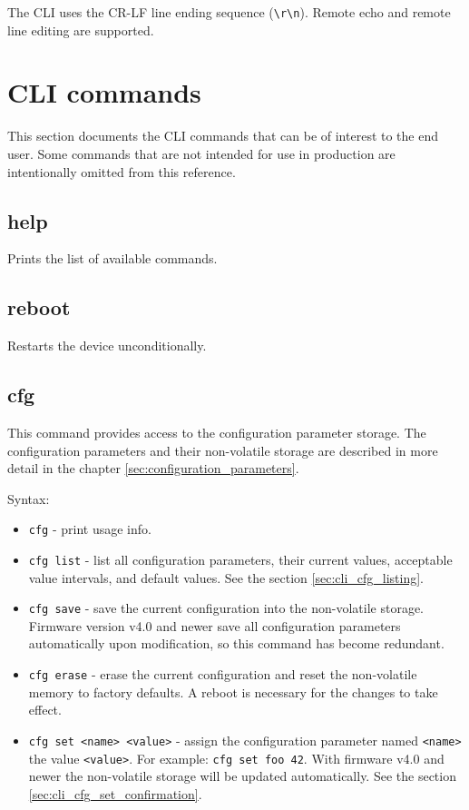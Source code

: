 \documentclass{zubaxdoc}
\begin{document}
The CLI uses the CR-LF line ending sequence (\verb|\r\n|).
Remote echo and remote line editing are supported.

\section{CLI commands}

This section documents the CLI commands that can be of interest to the end user.
Some commands that are not intended for use in production are intentionally omitted from this reference.

\subsection{help}

Prints the list of available commands.

\subsection{reboot}

Restarts the device unconditionally.

\subsection{cfg}

This command provides access to the configuration parameter storage.
The configuration parameters and their non-volatile storage are described in more detail in the chapter
\ref{sec:configuration_parameters}.

Syntax:
\begin{itemize}

    \item \verb|cfg| - print usage info.

    \item \verb|cfg list| - list all configuration parameters, their current values,
          acceptable value intervals, and default values. See the section \ref{sec:cli_cfg_listing}.

    \item \verb|cfg save| - save the current configuration into the non-volatile storage.
          Firmware version v4.0 and newer save all configuration parameters automatically upon modification,
          so this command has become redundant.

    \item \verb|cfg erase| - erase the current configuration and reset the non-volatile memory to factory defaults.
          A reboot is necessary for the changes to take effect.

    \item \verb|cfg set <name> <value>| - assign the configuration parameter named \verb|<name>| the value
          \verb|<value>|. For example: \verb|cfg set foo 42|.
          With firmware v4.0 and newer the non-volatile storage will be updated automatically.
          See the section \ref{sec:cli_cfg_set_confirmation}.

\end{itemize}
\end{document}
